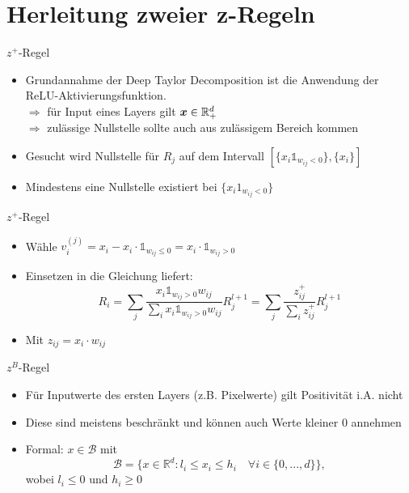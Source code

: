 \section{Herleitung zweier z-Regeln}
\frame{\sectionpage}
\begin{frame}{$z^+$-Regel}
\begin{itemize}
\item Grundannahme der Deep Taylor Decomposition ist die Anwendung der ReLU-Aktivierungsfunktion. \\
$\Rightarrow$ für Input eines Layers gilt $\boldsymbol{x} \in \mathbb{R}_+^d$ \\
$\Rightarrow$ zulässige Nullstelle sollte auch aus zulässigem Bereich kommen 
\item Gesucht wird Nullstelle für $R_j$ auf dem Intervall $[ \{x_i \mathds{1}_{w_{ij} < 0}\}, \{x_i\}]$
\item Mindestens eine Nullstelle existiert bei $\{x_i 1_{w_{ij} < 0}\}$
\end{itemize}
\end{frame}

\begin{frame}{$z^+$-Regel}
\begin{itemize}
\item Wähle $v_i^{(j)} = x_i - x_i \cdot \mathds{1}_{w_{ij} \leq 0} = x_i \cdot \mathds{1}_{w_{ij} > 0}$
\item Einsetzen in die Gleichung liefert:
\begin{equation*}
R_i = \sum_{j} \frac{x_i \mathds{1}_{w_{ij} > 0} w_{i j}}{\sum_{i} x_i \mathds{1}_{w_{ij} > 0} w_{i j}} R_j^{l+1} = \sum_{j} \frac{z_{ij}^{+}}{\sum_{i} z_{ij}^{+}} R_j^{l+1}
\end{equation*}
\item Mit $z_{ij} = x_i \cdot w_{ij}$
\end{itemize}
\end{frame}

\begin{frame}{$z^B$-Regel}
\begin{itemize}
\item Für Inputwerte des ersten Layers (z.B. Pixelwerte) gilt Positivität i.A. nicht 
\item Diese sind meistens beschränkt und können auch Werte kleiner 0 annehmen
\item Formal: $x \in \mathcal{B}$ mit\\
\begin{equation*}
\mathcal{B} = \{x \in \mathbb{R}^d: l_i \leq x_i \leq h_i \quad \forall i \in \{0, ..., d\}\},
\end{equation*}
wobei $l_i \leq 0$ und $h_i \geq 0$
\end{itemize}
\end{frame}

